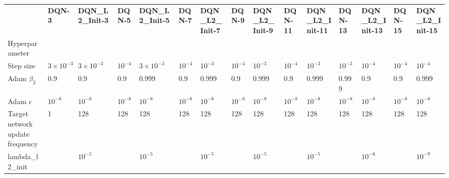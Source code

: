 \begin{tabular}{lllllllllllllll}
 & \bfseries DQN-3 & \bfseries DQN_L2_Init-3 & \bfseries DQN-5 & \bfseries DQN_L2_Init-5 & \bfseries DQN-7 & \bfseries DQN_L2_Init-7 & \bfseries DQN-9 & \bfseries DQN_L2_Init-9 & \bfseries DQN-11 & \bfseries DQN_L2_Init-11 & \bfseries DQN-13 & \bfseries DQN_L2_Init-13 & \bfseries DQN-15 & \bfseries DQN_L2_Init-15 \\
Hyperparameter &  &  &  &  &  &  &  &  &  &  &  &  &  &  \\
Step size & $3 \times 10^{-3}$ & $3 \times 10^{-3}$ & $10^{-4}$ & $3 \times 10^{-3}$ & $10^{-4}$ & $10^{-3}$ & $10^{-4}$ & $10^{-3}$ & $10^{-4}$ & $10^{-3}$ & $10^{-3}$ & $10^{-4}$ & $10^{-4}$ & $10^{-4}$ \\
Adam $\beta_2$ & 0.9 & 0.9 & 0.9 & 0.999 & 0.9 & 0.999 & 0.9 & 0.999 & 0.9 & 0.999 & 0.999 & 0.9 & 0.9 & 0.999 \\
Adam $\epsilon$ & $10^{-8}$ & $10^{-8}$ & $10^{-8}$ & $10^{-8}$ & $10^{-8}$ & $10^{-8}$ & $10^{-8}$ & $10^{-8}$ & $10^{-8}$ & $10^{-8}$ & $10^{-8}$ & $10^{-8}$ & $10^{-8}$ & $10^{-8}$ \\
Target network update frequency & 1 & 128 & 128 & 128 & 128 & 128 & 128 & 128 & 128 & 128 & 128 & 128 & 128 & 128 \\
lambda_l2_init &  & $10^{-5}$ &  & $10^{-5}$ &  & $10^{-5}$ &  & $10^{-5}$ &  & $10^{-5}$ &  & $10^{-6}$ &  & $10^{-9}$ \\
\end{tabular}
